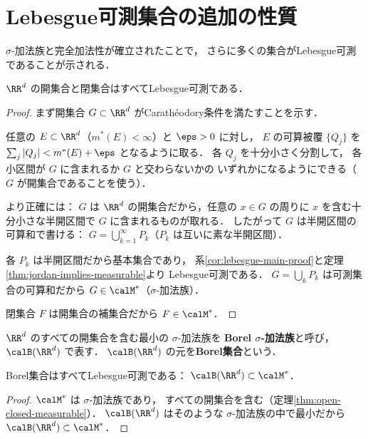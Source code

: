 \section{Lebesgue可測集合の追加の性質}\label{sec:additional-properties}

$\sigma$-加法族と完全加法性が確立されたことで，
さらに多くの集合がLebesgue可測であることが示される．

\begin{theorem}\label{thm:open-closed-measurable}
$\RR^d$ の開集合と閉集合はすべてLebesgue可測である．
\end{theorem}
\begin{proof}
まず開集合 $G \subset \RR^d$ がCarath\'eodory条件を満たすことを示す．

任意の $E \subset \RR^d$（$m^*(E) < \infty$）と $\eps > 0$ に対し，
$E$ の可算被覆 $\{Q_j\}$ を
$\sum_j |Q_j| < m^*(E) + \eps$ となるように取る．
各 $Q_j$ を十分小さく分割して，
各小区間が $G$ に含まれるか $G$ と交わらないかの
いずれかになるようにできる（$G$ が開集合であることを使う）．

より正確には：
$G$ は $\RR^d$ の開集合だから，任意の $x \in G$ の周りに
$x$ を含む十分小さな半開区間で $G$ に含まれるものが取れる．
したがって $G$ は半開区間の可算和で書ける：
$G = \bigcup_{k=1}^{\infty} P_k$（$P_k$ は互いに素な半開区間）．

各 $P_k$ は半開区間だから基本集合であり，
系\ref{cor:lebesgue-main-proof}と定理\ref{thm:jordan-implies-measurable}より
Lebesgue可測である．
$G = \bigcup_k P_k$ は可測集合の可算和だから
$G \in \calM^*$（$\sigma$-加法族）．

閉集合 $F$ は開集合の補集合だから $F \in \calM^*$．
\end{proof}

\begin{definition}[Borel集合族]\label{def:borel-sigma}
$\RR^d$ のすべての開集合を含む最小の $\sigma$-加法族を
\textbf{Borel $\sigma$-加法族}と呼び，$\calB(\RR^d)$ で表す．
$\calB(\RR^d)$ の元を\textbf{Borel集合}という．
\end{definition}

\begin{corollary}\label{cor:borel-measurable}
Borel集合はすべてLebesgue可測である：
$\calB(\RR^d) \subset \calM^*$．
\end{corollary}
\begin{proof}
$\calM^*$ は $\sigma$-加法族であり，
すべての開集合を含む（定理\ref{thm:open-closed-measurable}）．
$\calB(\RR^d)$ はそのような $\sigma$-加法族の中で最小だから
$\calB(\RR^d) \subset \calM^*$．
\end{proof}


